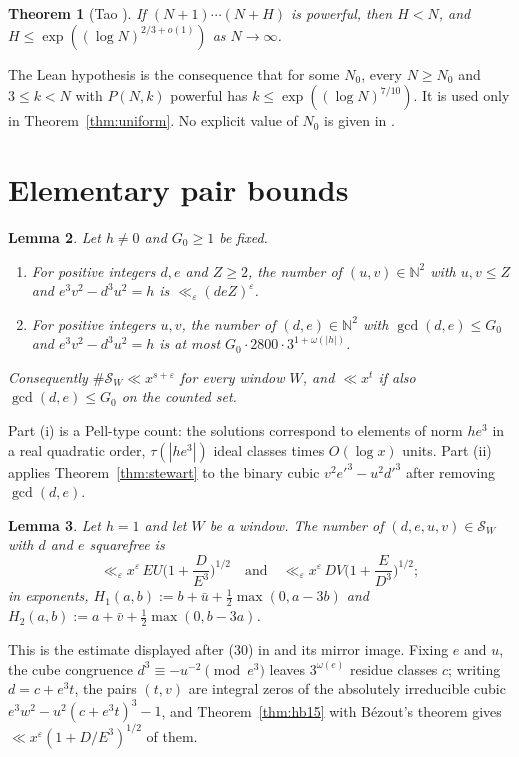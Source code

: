 \documentclass[11pt,reqno]{amsart}
\newtheorem{theorem}{Theorem}[section]
\newtheorem{lemma}[theorem]{Lemma}
\theoremstyle{definition}
\theoremstyle{remark}
\numberwithin{equation}{section}
\newcommand{\N}{\mathbb N}
\newcommand{\ub}{\bar u}
\newcommand{\vb}{\bar v}
\begin{document}
\begin{theorem}[{Tao \cite[Lemma~3.1]{Tao}}]\label{thm:tao}
If $(N+1)\cdots(N+H)$ is powerful, then $H<N$, and
$H\le\exp((\log N)^{2/3+o(1)})$ as $N\to\infty$.
\end{theorem}
The Lean hypothesis is the consequence that for some $N_0$, every
$N\ge N_0$ and $3\le k<N$ with $P(N,k)$ powerful has
$k\le\exp((\log N)^{7/10})$. It is used only in Theorem~\ref{thm:uniform}.
No explicit value of $N_0$ is given in \cite{Tao}.

\section{Elementary pair bounds}\label{sec:elem}

\begin{lemma}\label{lem:pellthue}
Let $h\ne0$ and $G_0\ge1$ be fixed.
\begin{enumerate}[label=\textup{(\roman*)}]
\item For positive integers $d,e$ and $Z\ge2$, the number of $(u,v)\in\N^2$ with
$u,v\le Z$ and $e^3v^2-d^3u^2=h$ is $\ll_\varepsilon(deZ)^{\varepsilon}$.
\item For positive integers $u,v$, the number of $(d,e)\in\N^2$ with
$\gcd(d,e)\le G_0$ and $e^3v^2-d^3u^2=h$ is at most $G_0\cdot2800\cdot3^{1+\omega(|h|)}$.
\end{enumerate}
Consequently $\#\mathcal S_W\ll x^{s+\varepsilon}$ for every window $W$, and
$\ll x^{t}$ if also $\gcd(d,e)\le G_0$ on the counted set.
\end{lemma}
Part (i) is a Pell-type count: the solutions correspond to elements of norm
$he^3$ in a real quadratic order, $\tau(|he^3|)$ ideal classes times $O(\log x)$
units. Part (ii) applies Theorem~\ref{thm:stewart} to the binary cubic
$v^2e'^3-u^2d'^3$ after removing $\gcd(d,e)$.

\begin{lemma}\label{lem:hb}
Let $h=1$ and let $W$ be a window. The number of $(d,e,u,v)\in\mathcal S_W$
with $d$ and $e$ squarefree is
\[
\ll_\varepsilon x^{\varepsilon}\,EU\Big(1+\frac{D}{E^3}\Big)^{1/2}
\quad\text{and}\quad
\ll_\varepsilon x^{\varepsilon}\,DV\Big(1+\frac{E}{D^3}\Big)^{1/2};
\]
in exponents, $H_1(a,b):=b+\ub+\tfrac12\max(0,a-3b)$ and
$H_2(a,b):=a+\vb+\tfrac12\max(0,b-3a)$.
\end{lemma}
This is the estimate displayed after (30) in \cite[\S5]{Reuss} and its mirror
image. Fixing $e$ and $u$, the cube congruence $d^3\equiv-u^{-2}\pmod{e^3}$
leaves $3^{\omega(e)}$ residue classes $c$; writing $d=c+e^3t$, the pairs
$(t,v)$ are integral zeros of the absolutely irreducible cubic
$e^3w^2-u^2(c+e^3t)^3-1$, and Theorem~\ref{thm:hb15} with Bézout's theorem
gives $\ll x^{\varepsilon}(1+D/E^3)^{1/2}$ of them.
\end{document}
